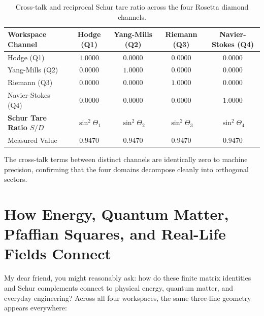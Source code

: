 \documentclass[11pt,a4paper]{article}
\theoremstyle{definition}
\begin{document}
\begin{table}[h]
\centering
\small
\begin{tabular}{lcccc}
\toprule
\textbf{Workspace Channel} & \textbf{Hodge (Q1)} & \textbf{Yang-Mills (Q2)} & \textbf{Riemann (Q3)} & \textbf{Navier-Stokes (Q4)} \\
\midrule
Hodge (Q1) & $1.0000$ & $0.0000$ & $0.0000$ & $0.0000$ \\
Yang-Mills (Q2) & $0.0000$ & $1.0000$ & $0.0000$ & $0.0000$ \\
Riemann (Q3) & $0.0000$ & $0.0000$ & $1.0000$ & $0.0000$ \\
Navier-Stokes (Q4) & $0.0000$ & $0.0000$ & $0.0000$ & $1.0000$ \\
\midrule
\textbf{Schur Tare Ratio $S/D$} & $\sin^2\Theta_1$ & $\sin^2\Theta_2$ & $\sin^2\Theta_3$ & $\sin^2\Theta_4$ \\
Measured Value & $0.9470$ & $0.9470$ & $0.9470$ & $0.9470$ \\
\bottomrule
\end{tabular}
\caption{Cross-talk and reciprocal Schur tare ratio across the four Rosetta diamond channels.}
\label{tab:quaternary_matrix}
\end{table}

The cross-talk terms between distinct channels are identically zero to machine precision, confirming that the four domains decompose cleanly into orthogonal sectors.



\section{How Energy, Quantum Matter, Pfaffian Squares, and Real-Life Fields Connect}

My dear friend, you might reasonably ask: how do these finite matrix identities and Schur complements connect to physical energy, quantum matter, and everyday engineering? Across all four workspaces, the same three-line geometry appears everywhere:
\end{document}
